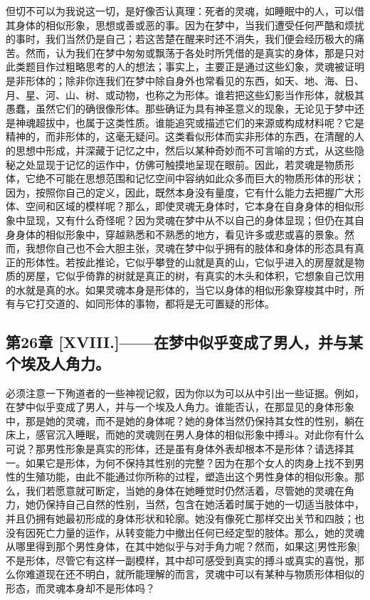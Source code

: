 但切不可以为我说这一切，是好像否认真理：死者的灵魂，如睡眠中的人，可以借其身体的相似形象，思想或善或恶的事。因为在梦中，当我们遭受任何严酷和烦扰的事时，我们当然仍是自己；若这苦楚在醒来时还不消失，我们便会经历极大的痛苦。然而，认为我们在梦中匆匆或飘荡于各处时所凭借的是真实的身体，那是只对此类题目作过粗略思考的人的想法；事实上，主要正是通过这些幻象，灵魂被证明是非形体的；除非你连我们在梦中除自身外也常看见的东西，如天、地、海、日、月、星、河、山、树、或动物，也称之为形体。谁若把这些幻影当作形体，就极其愚蠢，虽然它们的确很像形体。那些确证为具有神圣意义的现象，无论见于梦中还是神魂超拔中，也属于这类性质。谁能追究或描述它们的来源或构成材料呢？它是精神的，而非形体的，这毫无疑问。这类看似形体而实非形体的东西，在清醒的人的思想中形成，并深藏于记忆之中，然后以某种奇妙而不可言喻的方式，从这些隐秘之处显现于记忆的运作中，仿佛可触摸地呈现在眼前。因此，若灵魂是物质形体，它绝不可能在思想范围和记忆空间中容纳如此众多而巨大的物质形体的形状；因为，按照你自己的定义，因此，既然本身没有量度，它有什么能力去把握广大形体、空间和区域的模样呢？那么，即使灵魂无身体时，它本身在自身身体的相似形象中显现，又有什么奇怪呢？因为灵魂在梦中从不以自己的身体显现；但仍在其自身身体的相似形象中，穿越熟悉和不熟悉的地方，看见许多或悲或喜的景象。然而，我想你自己也不会大胆主张，灵魂在梦中似乎拥有的肢体和身体的形态具有真正的形体性。若按此推论，它似乎攀登的山就是真的山，它似乎进入的房屋就是物质的房屋，它似乎倚靠的树就是真正的树，有真实的木头和体积，它想象自己饮用的水就是真的水。如果灵魂本身是形体的，当它以身体的相似形象穿梭其中时，所有与它打交道的、如同形体的事物，都将是无可置疑的形体。\par


\subsection{第26章 [XVIII.]——在梦中似乎变成了男人，并与某个埃及人角力。}

必须注意一下殉道者的一些神视记叙，因为你以为可以从中引出一些证据。例如，在梦中似乎变成了男人，并与一个埃及人角力。谁能否认，在那显见的身体形象中，那是她的灵魂，而不是她的身体呢？她的身体当然仍保持其女性的性别，躺在床上，感官沉入睡眠，而她的灵魂则在男人身体的相似形象中搏斗。对此你有什么可说？那男性形象是真实的形体，还是虽有身体外表却根本不是形体？请选择其一。如果它是形体，为何不保持其性别的完整？因为在那个女人的肉身上找不到男性的生殖功能，由此不能通过你所称的过程，塑造出这个男性身体的相似形象。那么，我们若愿意就可断定，当她的身体在她睡觉时仍然活着，尽管她的灵魂在角力，她仍保持自己自然的性别，当然，包含在她活着时属于她的一切适当肢体中，并且仍拥有她最初形成的身体形状和轮廓。她没有像死亡那样交出关节和四肢；也没有因死亡力量的运作，从转变能力中撤出任何已经定型的肢体。那么，她的灵魂从哪里得到那个男性身体，在其中她似乎与对手角力呢？然而，如果这[男性形象]不是形体，尽管它有这样一副模样，其中却可感受到真实的搏斗或真实的喜悦，那么你难道现在还不明白，就所能理解的而言，灵魂中可以有某种与物质形体相似的形态，而灵魂本身却不是形体吗？\par

